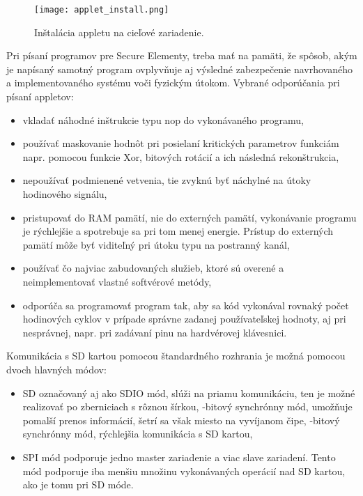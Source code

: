 \documentclass[12pt,a4paper,oneside,openright]{report}
\begin{document}
\begin{figure*}[h]
	\centering
	\texttt{[image: applet\_install.png]}
	\caption{Inštalácia appletu na cieľové zariadenie. \cite{javacardinstruction}}
	\label{f:applet_install}
\end{figure*}


Pri písaní programov pre Secure Elementy, treba mať na pamäti, že spôsob, akým je napísaný samotný program ovplyvňuje aj výsledné zabezpečenie navrhovaného a implementovaného systému voči fyzickým útokom.
Vybrané odporúčania pri písaní appletov:
\begin{itemize}
	\item vkladať náhodné inštrukcie typu nop do vykonávaného programu,
	\item používať maskovanie hodnôt pri posielaní kritických parametrov funkciám napr. pomocou funkcie Xor, bitových rotácií a ich následná rekonštrukcia,
	\item nepoužívať podmienené vetvenia, tie zvyknú byť náchylné na útoky hodinového signálu,
	\item pristupovať do RAM pamätí, nie do externých pamätí, vykonávanie programu je rýchlejšie a spotrebuje sa pri tom menej energie. Prístup do externých pamätí môže byť viditeľný pri útoku typu na postranný kanál,
	\item používať čo najviac zabudovaných služieb, ktoré sú overené a neimplementovať vlastné softvérové metódy,
	\item odporúča sa programovať program tak, aby sa kód vykonával rovnaký počet hodinových cyklov v prípade správne zadanej používateľskej hodnoty, aj pri nesprávnej, napr. pri zadávaní pinu na hardvérovej klávesnici.
\end{itemize}
\onehalfspacing

Komunikácia s SD kartou pomocou štandardného rozhrania je možná pomocou dvoch hlavných módov\cite{sdio}:
\singlespacing
\begin{itemize}
	\item SD označovaný aj ako SDIO mód, slúži na priamu komunikáciu, ten je možné realizovať po zberniciach s rôznou šírkou,
	-bitový synchrónny mód, umožňuje pomalší prenos informácií, šetrí sa však miesto na vyvíjanom čipe,
	-bitový synchrónny mód, rýchlejšia komunikácia s SD kartou,
	\item SPI mód podporuje jedno master zariadenie a viac slave zariadení. Tento mód podporuje iba menšiu množinu vykonávaných operácií nad SD kartou, ako je tomu pri SD móde.
\end{itemize}
\onehalfspacing
\end{document}

